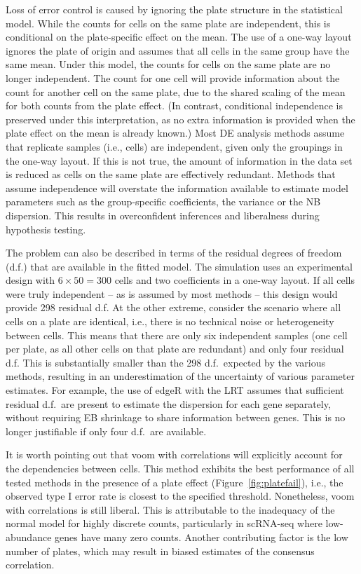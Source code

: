 \documentclass{article}
\begin{document}
Loss of error control is caused by ignoring the plate structure in the statistical model.
While the counts for cells on the same plate are independent, this is conditional on the plate-specific effect on the mean.
The use of a one-way layout ignores the plate of origin and assumes that all cells in the same group have the same mean.
Under this model, the counts for cells on the same plate are no longer independent.
The count for one cell will provide information about the count for another cell on the same plate,
    due to the shared scaling of the mean for both counts from the plate effect.
(In contrast, conditional independence is preserved under this interpretation, as no extra information is provided when the plate effect on the mean is already known.)
Most DE analysis methods assume that replicate samples (i.e., cells) are independent, given only the groupings in the one-way layout.
If this is not true, the amount of information in the data set is reduced as cells on the same plate are effectively redundant.
Methods that assume independence will overstate the information available to estimate model parameters such as the group-specific coefficients, the variance or the NB dispersion.
This results in overconfident inferences and liberalness during hypothesis testing.

The problem can also be described in terms of the residual degrees of freedom (d.f.) that are available in the fitted model.
The simulation uses an experimental design with $6 \times 50 =  300$ cells and two coefficients in a one-way layout.
If all cells were truly independent -- as is assumed by most methods -- this design would provide 298 residual d.f. 
At the other extreme, consider the scenario where all cells on a plate are identical, i.e., there is no technical noise or heterogeneity between cells.
This means that there are only six independent samples (one cell per plate, as all other cells on that plate are redundant) and only four residual d.f.
This is substantially smaller than the 298 d.f.\ expected by the various methods, resulting in an underestimation of the uncertainty of various parameter estimates.
For example, the use of edgeR with the LRT assumes that sufficient residual d.f.\ are present to estimate the dispersion for each gene separately,
    without requiring EB shrinkage to share information between genes.
This is no longer justifiable if only four d.f.\ are available.

It is worth pointing out that voom with correlations will explicitly account for the dependencies between cells.
This method exhibits the best performance of all tested methods in the presence of a plate effect (Figure~\ref{fig:platefail}),
    i.e., the observed type I error rate is closest to the specified threshold.
Nonetheless, voom with correlations is still liberal.
This is attributable to the inadequacy of the normal model for highly discrete counts, particularly in scRNA-seq where low-abundance genes have many zero counts.
Another contributing factor is the low number of plates, which may result in biased estimates of the consensus correlation.
\end{document}
